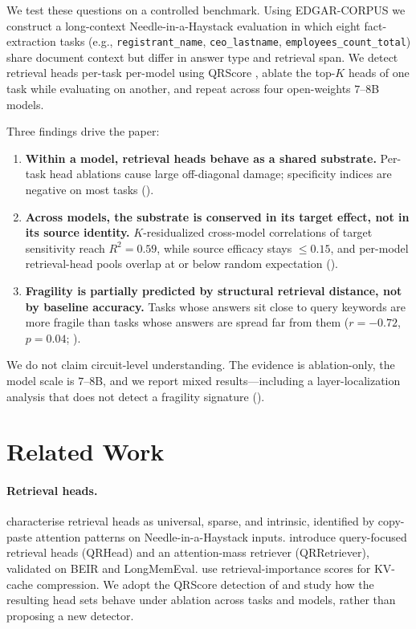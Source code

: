 \documentclass{article}
\theoremstyle{plain}
\theoremstyle{definition}
\theoremstyle{remark}
\begin{document}
We test these questions on a controlled benchmark. Using EDGAR-CORPUS \citep{loukas2021edgar} we construct a long-context Needle-in-a-Haystack evaluation in which eight fact-extraction tasks (e.g., \texttt{registrant\_name}, \texttt{ceo\_lastname}, \texttt{employees\_count\_total}) share document context but differ in answer type and retrieval span. We detect retrieval heads per-task per-model using QRScore \citep{zhang2025qrhead}, ablate the top-$K$ heads of one task while evaluating on another, and repeat across four open-weights $7$--$8$B models.

Three findings drive the paper:
\begin{enumerate}
\itemsep0pt
\item \textbf{Within a model, retrieval heads behave as a shared substrate.} Per-task head ablations cause large off-diagonal damage; specificity indices are negative on most tasks ().
\item \textbf{Across models, the substrate is conserved in its target effect, not in its source identity.} $K$-residualized cross-model correlations of target sensitivity reach $R^2{=}0.59$, while source efficacy stays $\leq 0.15$, and per-model retrieval-head pools overlap at or below random expectation ().
\item \textbf{Fragility is partially predicted by structural retrieval distance, not by baseline accuracy.} Tasks whose answers sit close to query keywords are more fragile than tasks whose answers are spread far from them ($r{=}{-}0.72$, $p{=}0.04$; ).
\end{enumerate}

We do not claim circuit-level understanding. The evidence is ablation-only, the model scale is $7$--$8$B, and we report mixed results---including a layer-localization analysis that does not detect a fragility signature ().

\section{Related Work}

\paragraph{Retrieval heads.} \citet{wu2024retrieval} characterise retrieval heads as universal, sparse, and intrinsic, identified by copy-paste attention patterns on Needle-in-a-Haystack inputs. \citet{zhang2025qrhead} introduce query-focused retrieval heads (QRHead) and an attention-mass retriever (QRRetriever), validated on BEIR and LongMemEval. \citet{fu2024headkv} use retrieval-importance scores for KV-cache compression. We adopt the QRScore detection of \citet{zhang2025qrhead} and study how the resulting head sets behave under ablation across tasks and models, rather than proposing a new detector.
\end{document}
